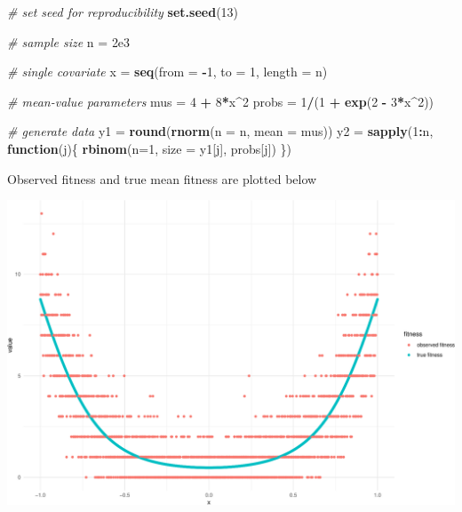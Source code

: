 \documentclass[
  ignorenonframetext,
]{beamer}
\newenvironment{Shaded}{\begin{snugshade}}{\end{snugshade}}
\newcommand{\AttributeTok}[1]{\textcolor[rgb]{0.13,0.29,0.53}{#1}}
\newcommand{\CommentTok}[1]{\textcolor[rgb]{0.56,0.35,0.01}{\textit{#1}}}
\newcommand{\ControlFlowTok}[1]{\textcolor[rgb]{0.13,0.29,0.53}{\textbf{#1}}}
\newcommand{\DecValTok}[1]{\textcolor[rgb]{0.00,0.00,0.81}{#1}}
\newcommand{\FloatTok}[1]{\textcolor[rgb]{0.00,0.00,0.81}{#1}}
\newcommand{\FunctionTok}[1]{\textcolor[rgb]{0.13,0.29,0.53}{\textbf{#1}}}
\newcommand{\NormalTok}[1]{#1}
\newcommand{\OtherTok}[1]{\textcolor[rgb]{0.56,0.35,0.01}{#1}}
\newcommand{\SpecialCharTok}[1]{\textcolor[rgb]{0.81,0.36,0.00}{\textbf{#1}}}
\begin{document}
\begin{frame}[fragile]{}
\protect\hypertarget{section-57}{}
\tiny

\begin{Shaded}
\begin{Highlighting}[]
\CommentTok{\# set seed for reproducibility}
\FunctionTok{set.seed}\NormalTok{(}\DecValTok{13}\NormalTok{)}

\CommentTok{\# sample size}
\NormalTok{n }\OtherTok{=} \FloatTok{2e3}

\CommentTok{\# single covariate}
\NormalTok{x }\OtherTok{=} \FunctionTok{seq}\NormalTok{(}\AttributeTok{from =} \SpecialCharTok{{-}}\DecValTok{1}\NormalTok{, }\AttributeTok{to =} \DecValTok{1}\NormalTok{, }\AttributeTok{length =}\NormalTok{ n)}

\CommentTok{\# mean{-}value parameters}
\NormalTok{mus }\OtherTok{=} \DecValTok{4} \SpecialCharTok{+} \DecValTok{8}\SpecialCharTok{*}\NormalTok{x}\SpecialCharTok{\^{}}\DecValTok{2}
\NormalTok{probs }\OtherTok{=} \DecValTok{1}\SpecialCharTok{/}\NormalTok{(}\DecValTok{1} \SpecialCharTok{+} \FunctionTok{exp}\NormalTok{(}\DecValTok{2} \SpecialCharTok{{-}} \DecValTok{3}\SpecialCharTok{*}\NormalTok{x}\SpecialCharTok{\^{}}\DecValTok{2}\NormalTok{))}

\CommentTok{\# generate data}
\NormalTok{y1 }\OtherTok{=} \FunctionTok{round}\NormalTok{(}\FunctionTok{rnorm}\NormalTok{(}\AttributeTok{n =}\NormalTok{ n, }\AttributeTok{mean =}\NormalTok{ mus))}
\NormalTok{y2 }\OtherTok{=} \FunctionTok{sapply}\NormalTok{(}\DecValTok{1}\SpecialCharTok{:}\NormalTok{n, }\ControlFlowTok{function}\NormalTok{(j)\{}
  \FunctionTok{rbinom}\NormalTok{(}\AttributeTok{n=}\DecValTok{1}\NormalTok{, }\AttributeTok{size =}\NormalTok{ y1[j], probs[j])}
\NormalTok{\}) }
\end{Highlighting}
\end{Shaded}
\end{frame}

\begin{frame}{}
\protect\hypertarget{section-58}{}
Observed fitness and true mean fitness are plotted below

\includegraphics{week14p2_files/figure-beamer/unnamed-chunk-61-1.pdf}
\end{frame}
\end{document}
